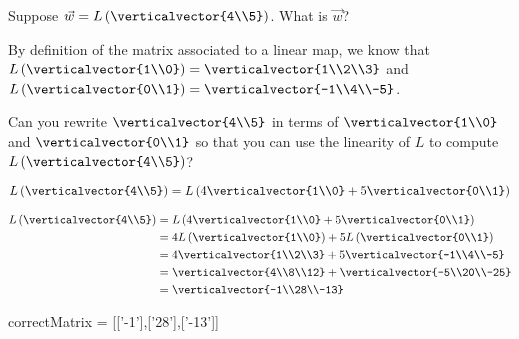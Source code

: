 \documentclass{ximera}
\begin{document}
\begin{question}
  Suppose $\vec{w} = L\left(\verticalvector{4\\5}\right)$.  What is $\vec{w}$?
    
  \begin{solution}
  	\begin{hint}
  		By definition of the matrix associated to a linear map, we know that $L\left(\verticalvector{1\\0}\right) = \verticalvector{1\\2\\3}$
  		and $L\left(\verticalvector{0\\1}\right) = \verticalvector{-1\\4\\-5}$.
  	\end{hint}
  	\begin{hint}
  		Can you rewrite $\verticalvector{4\\5}$ in terms of $\verticalvector{1\\0}$ and $\verticalvector{0\\1}$ so that you can use the linearity
  		of $L$ to compute $L\left(\verticalvector{4\\5}\right)$?
  	\end{hint}
  	\begin{hint}
  		$L\left(\verticalvector{4\\5}\right) = L\left(4\verticalvector{1\\0}+5\verticalvector{0\\1}\right)$
  	\end{hint}
  	\begin{hint}
  		\begin{align*}
  		L\left(\verticalvector{4\\5}\right) &= L\left(4\verticalvector{1\\0}+5\verticalvector{0\\1}\right)\\
  		&= 4L\left(\verticalvector{1\\0}\right)+5L\left(\verticalvector{0\\1}\right)\\
  		&=4\verticalvector{1\\2\\3}+5\verticalvector{-1\\4\\-5}\\
  		&=\verticalvector{4\\8\\12}+\verticalvector{-5\\20\\-25}\\
  		&=\verticalvector{-1\\28\\-13}
  		\end{align*}
  	\end{hint}
    \begin{matrix-answer}[name=w]
      correctMatrix = [['-1'],['28'],['-13']]
    \end{matrix-answer}          
  \end{solution}
  

\end{question}
\end{document}
